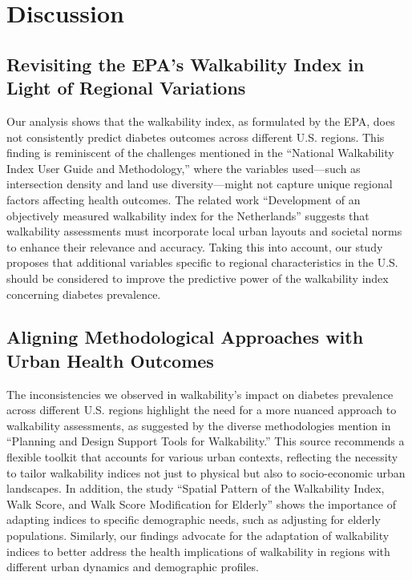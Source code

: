 \documentclass[
]{article}
\begin{document}
\section{Discussion}\label{discussion}

\subsection{Revisiting the EPA's Walkability Index in Light of Regional
Variations}\label{revisiting-the-epas-walkability-index-in-light-of-regional-variations}

Our analysis shows that the walkability index, as formulated by the EPA,
does not consistently predict diabetes outcomes across different U.S.
regions. This finding is reminiscent of the challenges mentioned in the
``National Walkability Index User Guide and Methodology,'' where the
variables used---such as intersection density and land use
diversity---might not capture unique regional factors affecting health
outcomes. The related work ``Development of an objectively measured
walkability index for the Netherlands'' suggests that walkability
assessments must incorporate local urban layouts and societal norms to
enhance their relevance and accuracy. Taking this into account, our
study proposes that additional variables specific to regional
characteristics in the U.S. should be considered to improve the
predictive power of the walkability index concerning diabetes
prevalence.

\subsection{Aligning Methodological Approaches with Urban Health
Outcomes}\label{aligning-methodological-approaches-with-urban-health-outcomes}

The inconsistencies we observed in walkability's impact on diabetes
prevalence across different U.S. regions highlight the need for a more
nuanced approach to walkability assessments, as suggested by the diverse
methodologies mention in ``Planning and Design Support Tools for
Walkability.'' This source recommends a flexible toolkit that accounts
for various urban contexts, reflecting the necessity to tailor
walkability indices not just to physical but also to socio-economic
urban landscapes. In addition, the study ``Spatial Pattern of the
Walkability Index, Walk Score, and Walk Score Modification for Elderly''
shows the importance of adapting indices to specific demographic needs,
such as adjusting for elderly populations. Similarly, our findings
advocate for the adaptation of walkability indices to better address the
health implications of walkability in regions with different urban
dynamics and demographic profiles.
\end{document}
